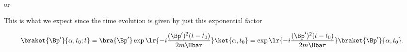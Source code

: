 {or


This is what we expect since the time evolution is given by just this exponential factor

\begin{dmath}\label{eqn:freeParticlePropagator:220}
\braket{\Bp'}{\alpha, t_0 ; t} 
= \bra{\Bp'} \exp\lr{ -i \frac{(\Bp')^2 (t -t_0)}{2 m \Hbar}} \ket{\alpha, t_0}
= 
\exp\lr{ -i \frac{(\Bp')^2 (t -t_0)}{2 m \Hbar}} 
\braket{\Bp'} 
{\alpha, t_0}.
\end{dmath}

} %


